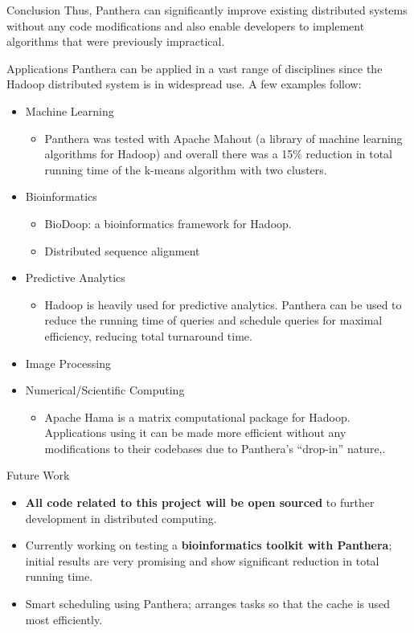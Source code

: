 \documentclass[final]{beamer} %
\begin{document}
\begin{frame}
\begin{columns}[t]
\begin{column}{0.32\textwidth}
\begin{block}{Conclusion}
    Thus, Panthera can significantly improve existing distributed systems
    without any code modifications and also enable developers to 
    implement algorithms that were previously impractical.
	
	\end{block}
	
	\begin{block}{Applications}
	Panthera can be applied in a vast range of disciplines since the Hadoop
	distributed system is in widespread use. A few examples follow: 
	\begin{itemize}
		\item Machine Learning
			\begin{itemize}
			\item Panthera was tested with Apache Mahout (a library of machine learning algorithms for Hadoop) and overall there was a 15\% reduction in total running time of
			the k-means algorithm with two clusters.
			\end{itemize}
			
		\item Bioinformatics
			\begin{itemize}
				\item BioDoop: a bioinformatics framework for Hadoop.
				\item Distributed sequence alignment
			\end{itemize}
			
		\item Predictive Analytics	
			\begin{itemize}
				\item Hadoop is heavily used for predictive analytics. Panthera can
				be used to reduce the running time of queries and schedule queries
				for maximal efficiency, reducing total turnaround time.
			\end{itemize}
		\item Image Processing
		\item Numerical/Scientific Computing
		\begin{itemize}
			\item Apache Hama is a matrix computational package for Hadoop. Applications using it can be made more efficient without any modifications to their codebases due to Panthera's ``drop-in'' nature,.
			\end{itemize}
	\end{itemize}
	\end{block}
	
	\begin{block}{Future Work}
	\begin{itemize}
		\item \textbf{All code related to this project will be open sourced} to further development in distributed computing.
		\item Currently working on testing a \textbf{bioinformatics toolkit with Panthera}; initial results are very promising and show significant reduction in total running time.
		\item Smart scheduling using Panthera; arranges tasks so that the cache is used most efficiently.
		

\end{itemize}
\end{block}
\end{column}
\end{columns}
\end{frame}
\end{document}
